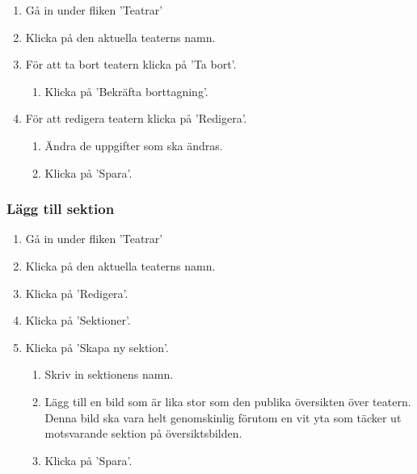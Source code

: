 \documentclass[a4paper, twoside, 11pt, titlepage]{article}
\begin{document}
		\begin{enumerate}
		\item Gå in under fliken 'Teatrar'

		\item Klicka på den aktuella teaterns namn.

		\item För att ta bort teatern klicka på 'Ta bort'.

		\begin{enumerate}
		\item Klicka på 'Bekräfta borttagning'.
		\end{enumerate}

		\item För att redigera teatern klicka på 'Redigera'.

		\begin{enumerate}
		\item Ändra de uppgifter som ska ändras.

		\item Klicka på 'Spara'.
		\end{enumerate}
		\end{enumerate}

		\subsubsection{Lägg till sektion}


		\begin{enumerate}
		\item Gå in under fliken 'Teatrar'

		\item Klicka på den aktuella teaterns namn.

		\item Klicka på 'Redigera'.

		\item Klicka på 'Sektioner'.

		\item Klicka på 'Skapa ny sektion'.

		\begin{enumerate}
		\item Skriv in sektionens namn.

		\item Lägg till en bild som är lika stor som den publika översikten över teatern. Denna bild ska vara helt genomskinlig förutom en vit yta som täcker ut motsvarande sektion på översiktsbilden.

		\item Klicka på 'Spara'.
		\end{enumerate}
		\end{enumerate}
\end{document}
